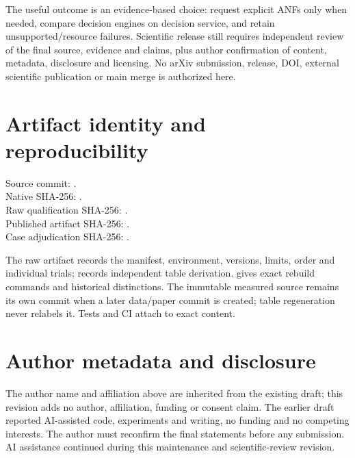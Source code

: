\documentclass[10pt,a4paper]{article}
\begin{document}
The useful outcome is an evidence-based choice: request explicit ANFs only when needed,
compare decision engines on decision service, and retain unsupported/resource failures.
Scientific release still requires independent review of the final source, evidence and
claims, plus author confirmation of content, metadata, disclosure and licensing. No arXiv
submission, release, DOI, external scientific publication or main merge is authorized here.

\section*{Artifact identity and reproducibility}
Source commit: \QualCommit.\\
Native SHA-256: \QualNative.\\
Raw qualification SHA-256: \QualRawHash.
\\Published artifact SHA-256: \QualArtifactHash.
\\Case adjudication SHA-256: \QualClassificationHash.

The raw artifact records the manifest, environment, versions, limits, order and individual
trials;  records independent table derivation.
 gives exact rebuild commands and historical distinctions.
The immutable measured source remains its own commit when a later data/paper commit is
created; table regeneration never relabels it. Tests and CI attach to exact content.

\section*{Author metadata and disclosure}
The author name and affiliation above are inherited from the existing draft; this revision
adds no author, affiliation, funding or consent claim. The earlier draft reported AI-assisted
code, experiments and writing, no funding and no competing interests. The author must
reconfirm the final statements before any submission. AI assistance continued during this
maintenance and scientific-review revision.



\end{document}
